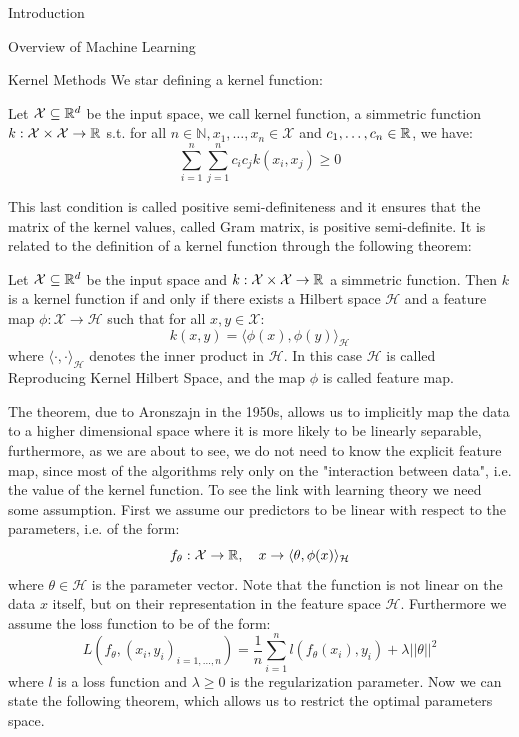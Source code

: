 \begin{chapter}{Introduction}
\begin{section}{Overview of Machine Learning }
 \end{section}

 \begin{section}{Kernel Methods}
  We star defining a kernel function:
  \begin{definition}
      Let $\mathcal{X} \subseteq \mathbb{R}^d$ be the input space, we call kernel function, a simmetric function $k: \mathcal{X}\times \mathcal{X} \to \mathbb{R}$ s.t. for all $n \in \mathbb{N}, x_1, \dots, x_n \in \mathcal{X}$ and $c_1, \dots, c_n \in \mathbb{R}$, we have:
      $$
          \sum_{i=1}^n \sum_{j=1}^n c_i c_j k(x_i, x_j) \ge 0
      $$
  \end{definition}
  This last condition is called positive semi-definiteness and it ensures that the matrix of the kernel values, called Gram matrix, is positive semi-definite. It is related to the definition of
  a kernel function through the following theorem:
  \begin{theorem}
      Let $\mathcal{X} \subseteq \mathbb{R}^d$ be the input space and $k: \mathcal{X}\times \mathcal{X} \to \mathbb{R}$ a simmetric function. Then $k$ is a kernel function if and only if there exists a Hilbert space $\mathcal{H}$ and a feature map $\phi: \mathcal{X} \to \mathcal{H}$ such that for all $x, y \in \mathcal{X}$:
      $$
          k(x, y) = \langle \phi(x), \phi(y) \rangle_{\mathcal{H}}
      $$
      where $\langle \cdot, \cdot \rangle_{\mathcal{H}}$ denotes the inner product in $\mathcal{H}$. In this
      case $\mathcal{H}$ is called Reproducing Kernel Hilbert Space, and the map $\phi$ is
      called feature map.
  \end{theorem}
  The theorem, due to Aronszajn in the 1950s, allows us to implicitly map the data to a higher
  dimensional space where it is more likely to be linearly separable, furthermore, as we are about to see, we do not
  need to know the explicit feature map, since most of the algorithms rely only on the "interaction between data", i.e. the value
  of the kernel function.
  \vspace{5pt}
  \newline To see the link with learning theory we need some assumption. First we assume our predictors to be
  linear with respect to the parameters, i.e. of the form:
  $$
      f_\theta: \mathcal{X}\rightarrow \mathbb{R}, \quad x \to \langle \theta, \phi(x) \rangle_{\mathcal{H}}
  $$
  where $\theta \in \mathcal{H}$ is the parameter vector. Note that the function is not linear on the data $x$ itself, but
  on their representation in the feature space $\mathcal{H}$. Furthermore we assume the loss function to be of the form:
  $$
      L(f_\theta, (x_i, y_i)_{i=1,\dots,n}) = \frac{1}{n}\sum_{i=1}^n l(f_\theta(x_i), y_i) + \lambda ||\theta||^2
  $$
  where $l$ is a loss function and $\lambda \geq 0$ is the regularization parameter.
  Now we can state the following theorem, which allows us to restrict the optimal parameters space.


\end{section}
\end{chapter}
